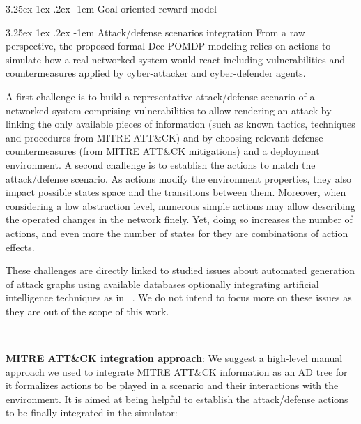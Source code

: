 \documentclass[conference]{IEEEtran}
\makeatletter
\renewcommand\paragraph{\@startsection{paragraph}{5}{\z@}%
  {3.25ex \@plus1ex \@minus.2ex}%
  {-1em}%
  {\normalfont\normalsize\bfseries}}
\makeatother
\begin{document}
\paragraph{Goal oriented reward model}

\paragraph{Attack/defense scenarios integration}
From a raw perspective, the proposed formal Dec-POMDP modeling relies on actions to simulate how a real networked system would react including vulnerabilities and countermeasures applied by cyber-attacker and cyber-defender agents.

A first challenge is to build a representative attack/defense scenario of a networked system comprising vulnerabilities to allow rendering an attack by linking the only available pieces of information (such as known tactics, techniques and procedures from MITRE ATT\&CK) and by choosing relevant defense countermeasures (from MITRE ATT\&CK mitigations) and a deployment environment. A second challenge is to establish the actions to match the attack/defense scenario. As actions modify the environment properties, they also impact possible states space and the transitions between them.
Moreover, when considering a low abstraction level, numerous simple actions may allow describing the operated changes in the network finely. Yet, doing so increases the number of actions, and even more the number of states for they are combinations of action effects.

These challenges are directly linked to studied issues about automated generation of attack graphs using available databases optionally integrating artificial intelligence techniques as in ~\cite{GFalco2018}. We do not intend to focus more on these issues as they are out of the scope of this work.

\

\noindent
\textbf{MITRE ATT\&CK integration approach}: We suggest a high-level manual approach we used to integrate MITRE ATT\&CK information as an AD tree for it formalizes actions to be played in a scenario and their interactions with the environment. It is aimed at being helpful to establish the attack/defense actions to be finally integrated in the simulator:
\end{document}

